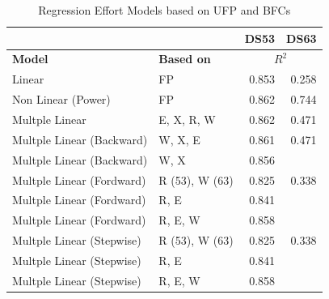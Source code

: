\documentclass[conference]{IEEEtran}
\begin{document}
\begin{table}
\centering
\caption{Regression Effort Models based on UFP and BFCs}
\label{T9}
\begin{tabular}{|l|l|r|r|}\hline
                          &                & \textbf{DS53}  & \textbf{DS63}  \\\hline
\textbf{Model}                     & \textbf{Based on}       & \multicolumn{2}{c}{\textbf{\(R^2\)}}           \\\hline
Linear                    & FP             & 0.853 & 0.258 \\
Non Linear (Power)        & FP             & 0.862 & 0.744 \\
Multple Linear            & E, X, R, W     & 0.862 & 0.471 \\
Multple Linear (Backward) & W, X, E        & 0.861 & 0.471 \\
Multple Linear (Backward) & W, X           & 0.856 &       \\
Multple Linear (Fordward) & R (53), W (63) & 0.825 & 0.338 \\
Multple Linear (Fordward) & R, E           & 0.841 &       \\
Multple Linear (Fordward) & R, E, W        & 0.858 &       \\
Multple Linear (Stepwise) & R (53), W (63) & 0.825 & 0.338 \\
Multple Linear (Stepwise) & R, E           & 0.841 &       \\
Multple Linear (Stepwise) & R, E, W        & 0.858 &  \\\hline 
\end{tabular}
\end{table}
\end{document}
